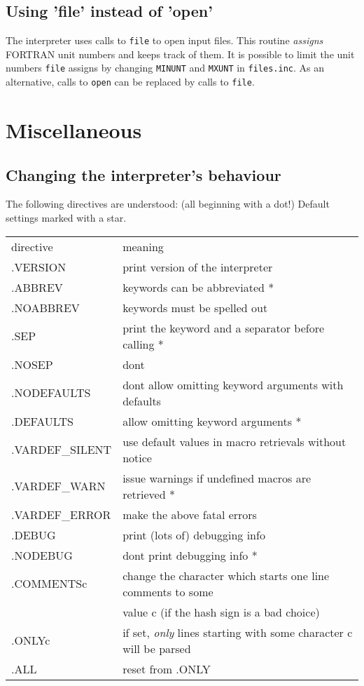 \documentclass[a4paper]{article}
\begin{document}
\subsection{Using 'file' instead of 'open'}
The interpreter uses calls to {\tt file} to open input files. This routine 
{\em assigns} FORTRAN unit numbers and keeps track of them. It is possible 
to limit the unit numbers {\tt file} assigns by changing {\tt MINUNT} and {\tt MXUNT} 
in {\tt files.inc}. As an  alternative, calls to {\tt open} can be replaced by calls
to {\tt file}. 


\section{Miscellaneous}
\subsection{Changing the interpreter's behaviour}
The following directives are understood: (all beginning with a dot!)
Default settings marked with a star.

\begin{tabular}{ll}
 directive & meaning \\
 .VERSION & print version of the interpreter \\ 
 .ABBREV  & keywords can be abbreviated * \\
 .NOABBREV & keywords must be spelled out \\
 .SEP      & print the keyword and a separator before calling *\\
 .NOSEP    & dont \\
 .NODEFAULTS & dont allow omitting keyword arguments with defaults\\
 .DEFAULTS & allow omitting keyword arguments * \\
 .VARDEF\_SILENT & use default values in macro retrievals without notice\\
 .VARDEF\_WARN & issue warnings if undefined macros are retrieved *\\
 .VARDEF\_ERROR & make the above fatal errors \\
 .DEBUG & print (lots of) debugging info \\
 .NODEBUG & dont print debugging info * \\
 .COMMENTSc & change the character which starts one line  comments to some\\
 &              value c (if the hash sign is a bad choice) \\
 .ONLYc & if set, {\em only} lines starting with some character c will be
 parsed\\
 .ALL & reset from .ONLY \\  
\end{tabular}
\end{document}
